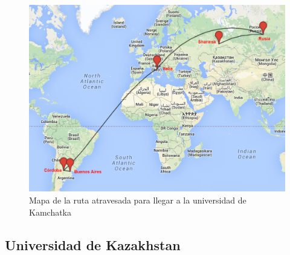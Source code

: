 \begin{figure}[H]
	\begin{center}
		  \includegraphics[scale=0.4]{../mapas/mapa_kamgu.png}
		  \caption{Mapa de la ruta atravesada para llegar a la universidad de Kamchatka}
		  \label{fig:contra1}
	\end{center}
\end{figure}

\subsection{Universidad de Kazakhstan}

